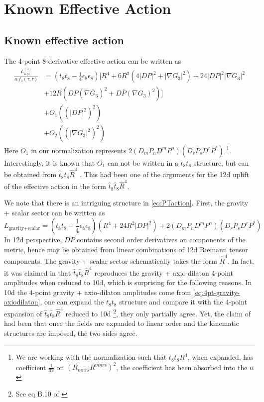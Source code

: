 \section{Known Effective Action}


\subsection{Known effective action}

The 4-point 8-derivative effective action can be written as \cite{Policastro:2008hg,Minasian:2015bxa,Liu:2025uqu} 
\begin{equation}
\begin{aligned}
\frac{L_{\text{4-pt}}^{(3)}}{\alpha\, f_{0}(\tau,\bar{\tau})}
&=\left(t_{8}t_{8}-\tfrac{1}{4}\epsilon_{8}\epsilon_{8}\right)\biggl[R^4+6R^{2}\left(4|DP|^{2}+|\nabla G_{3}|^{2}\right)+24|DP|^{2}|\nabla G_{3}|^{2}\\
&+12R\left(DP(\nabla\overline{G}_{3})^{2}+D\overline{P}(\nabla{G}_{3})^{2}\right)\biggr]\\
&+O_{1}\left((|DP|^{2})^{2}\right)\\
&+O_{2}\left((|\nabla G_{3}|^{2})^{2}\right)
\label{eq:PTaction}
\end{aligned}
\end{equation}
Here $O_1$ in our normalization represents $2 (D_m P_n D^m P^n)(D_r \bar{P}_s D^r \bar{P}^s)$ \footnote{We are working with the normalization such that $t_8t_8 R^4$, when expanded, has coefficient $\frac{1}{32}$ on $(R_{mnrs}R^{mnrs})^2$, the coefficient has been absorbed into the $\alpha$}.
Interestingly, it is known that $O_1$ can not be written in a $t_8t_8$ structure, but can be obtained from $\hat{t}_8\hat{t}_8 \hat{R}^4$ \cite{Minasian:2015bxa}.
This had been one of the arguments for the 12d uplift of the effective action in the form $\hat{t}_8\hat{t}_8 \hat{R}^4$.

We note that there is an intriguing structure in \eqref{eq:PTaction}.
First, the gravity + scalar sector can be written as
\begin{equation}
L_{\text{gravity+scalar}} = (t_8t_8 - \frac{1}{4}\epsilon_8\epsilon_8)
(R^4 + 24 R^2 |DP|^2) + 2 (D_m P_n D^m P^n)(D_r \bar{P}_s D^r \bar{P}^s)
\label{eq:4pt-gravity-axiodilaton}
\end{equation}
In 12d perspective, $DP$ contains second order derivatives on components of the metric, hence may be obtained from linear combinations of 12d Riemann tensor components.
The gravity + scalar sector schematically takes the form $\hat{R}^4$.
In fact, it was claimed in \cite{Minasian:2015bxa} that $\hat{t}_8\hat{t}_8 \hat{R}^4$ reproduces the gravity + axio-dilaton 4-point amplitudes when reduced to 10d, which is surprising for the following reasons.
In 10d the 4-point gravity + axio-dilaton amplitudes come from \eqref{eq:4pt-gravity-axiodilaton}, one can expand the $t_8t_8$ structure and compare it with the 4-point expansion of $\hat{t}_8 \hat{t}_8 \hat{R}^4$ reduced to 10d \footnote{See eq B.10 of \cite{Minasian:2015bxa}}, they only partially agree.
Yet, the claim of \cite{Minasian:2015bxa} had been that once the fields are expanded to linear order and the kinematic structures are imposed, the two sides agree.



